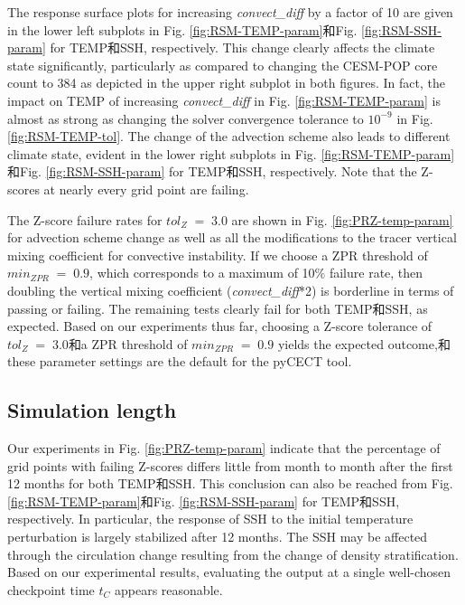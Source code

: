 The response surface plots for increasing \textit{convect\_diff} by a factor of 10 are given in the lower left subplots in Fig. \ref{fig:RSM-TEMP-param}和Fig. \ref{fig:RSM-SSH-param} for TEMP和SSH, respectively.  This change clearly affects the climate state significantly, particularly as compared to changing the CESM-POP core count to 384 as depicted in the upper right subplot in both figures.  In fact, the impact on TEMP of increasing \textit{convect\_diff} in Fig. \ref{fig:RSM-TEMP-param} is almost as strong as changing the solver convergence tolerance to $10^{-9}$ in Fig. \ref{fig:RSM-TEMP-tol}.  The change of the advection scheme also leads to different climate state, evident in the lower right subplots in Fig. \ref{fig:RSM-TEMP-param}和Fig. \ref{fig:RSM-SSH-param} for TEMP和SSH, respectively.  Note that the Z-scores at nearly every grid point are failing.

The Z-score failure rates for $tol_{Z} \; = \; 3.0$ are shown in Fig. \ref{fig:PRZ-temp-param} for advection scheme change as well as all the modifications to the tracer vertical mixing coefficient for convective instability.  If we choose a ZPR threshold of $min_{ZPR} \; = \; 0.9$, which corresponds to a maximum of 10\% failure rate,  then doubling the vertical mixing coefficient (\textit{convect\_diff}*2) is borderline in terms of passing or failing.  The remaining tests clearly fail for both TEMP和SSH, as expected. Based on our experiments thus far, choosing a Z-score tolerance of $tol_{Z} \; = \; 3.0$和a ZPR threshold of $min_{ZPR} \; = \; 0.9$ yields the expected outcome,和these parameter settings are the default for the pyCECT tool.  


 \subsection{Simulation length}



 Our experiments in Fig. \ref{fig:PRZ-temp-param} indicate that the percentage of grid points with failing Z-scores differs little from month to month after the first 12 months for both TEMP和SSH.  This conclusion can also be reached from Fig. \ref{fig:RSM-TEMP-param}和Fig. \ref{fig:RSM-SSH-param} for TEMP和SSH, respectively.  In particular, the response of SSH to the initial temperature perturbation is largely stabilized after 12 months. The SSH may be affected through the circulation change resulting from the change of density stratification.  Based on our experimental results, evaluating the output at a single well-chosen checkpoint time $t_C$ appears reasonable.

